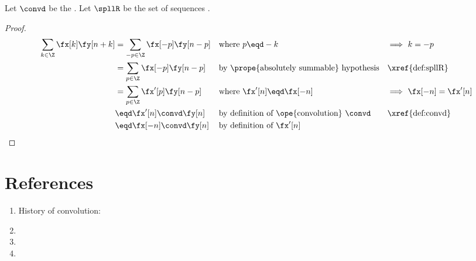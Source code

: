 \begin{proposition}
\label{prop:conv_knk}
Let $\convd$ be the  .
Let $\spllR$ be the set of  sequences .
\end{proposition}
\begin{proof}
\begin{align*}
  \sum_{k\in\Z} \fx[k]\fy[n+k]
    &= \sum_{-p\in\Z} \fx[-p]\fy[n-p]
    && \text{where $p\eqd -k$}
    && \text{$\implies$ $k=-p$}
  \\&= \sum_{p\in\Z} \fx[-p]\fy[n-p]
    && \text{by \prope{absolutely summable} hypothesis}
    && \text{\xref{def:spllR}}
  \\&= \sum_{p\in\Z} \fx'[p]\fy[n-p]
    && \text{where $\fx'[n] \eqd\fx[-n]$}
    && \text{$\implies$ $\fx[-n]=\fx'[n]$}
  \\&\eqd \fx'[n]\convd\fy[n]
    && \text{by definition of \ope{convolution} $\convd$}
    && \text{\xref{def:convd}}
  \\&\eqd \fx[-n]\convd\fy[n]
    && \text{by definition of $\fx'[n]$}
\end{align*}
\end{proof}


\section{References}
\begin{enumerate}
  \item History of convolution: 
  \item {}
  \item {}
  \item {} %
\end{enumerate}

